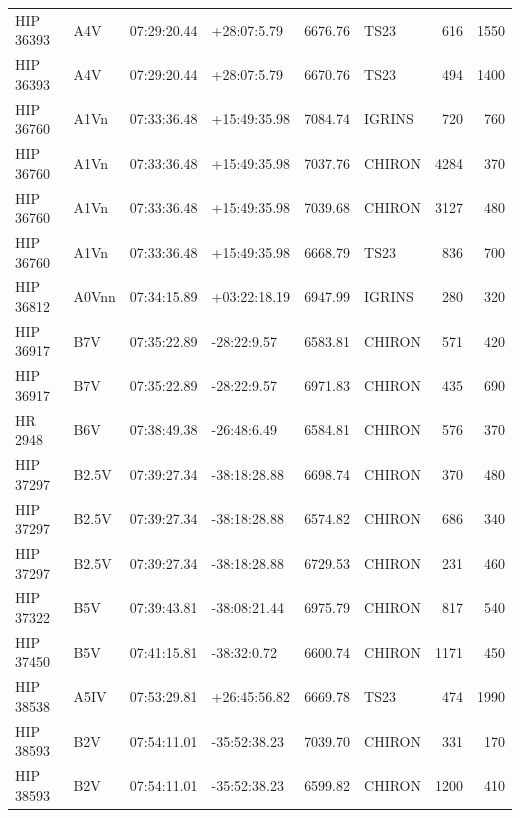 \documentclass{emulateapj}
\begin{document}
\begin{longtable*}{|l|lllrlrr|}
   HIP 36393 &            A4V &    07:29:20.44 &    +28:07:5.79 &  6676.76 &       TS23 &      616 &    1550 \\
   HIP 36393 &            A4V &    07:29:20.44 &    +28:07:5.79 &  6670.76 &       TS23 &      494 &    1400 \\
   HIP 36760 &           A1Vn &    07:33:36.48 &   +15:49:35.98 &  7084.74 &     IGRINS &      720 &     760 \\
   HIP 36760 &           A1Vn &    07:33:36.48 &   +15:49:35.98 &  7037.76 &     CHIRON &     4284 &     370 \\
   HIP 36760 &           A1Vn &    07:33:36.48 &   +15:49:35.98 &  7039.68 &     CHIRON &     3127 &     480 \\
   HIP 36760 &           A1Vn &    07:33:36.48 &   +15:49:35.98 &  6668.79 &       TS23 &      836 &     700 \\
   HIP 36812 &          A0Vnn &    07:34:15.89 &   +03:22:18.19 &  6947.99 &     IGRINS &      280 &     320 \\
   HIP 36917 &            B7V &    07:35:22.89 &    -28:22:9.57 &  6583.81 &     CHIRON &      571 &     420 \\
   HIP 36917 &            B7V &    07:35:22.89 &    -28:22:9.57 &  6971.83 &     CHIRON &      435 &     690 \\
     HR 2948 &            B6V &    07:38:49.38 &    -26:48:6.49 &  6584.81 &     CHIRON &      576 &     370 \\
   HIP 37297 &          B2.5V &    07:39:27.34 &   -38:18:28.88 &  6698.74 &     CHIRON &      370 &     480 \\
   HIP 37297 &          B2.5V &    07:39:27.34 &   -38:18:28.88 &  6574.82 &     CHIRON &      686 &     340 \\
   HIP 37297 &          B2.5V &    07:39:27.34 &   -38:18:28.88 &  6729.53 &     CHIRON &      231 &     460 \\
   HIP 37322 &            B5V &    07:39:43.81 &   -38:08:21.44 &  6975.79 &     CHIRON &      817 &     540 \\
   HIP 37450 &            B5V &    07:41:15.81 &    -38:32:0.72 &  6600.74 &     CHIRON &     1171 &     450 \\
   HIP 38538 &           A5IV &    07:53:29.81 &   +26:45:56.82 &  6669.78 &       TS23 &      474 &    1990 \\
   HIP 38593 &            B2V &    07:54:11.01 &   -35:52:38.23 &  7039.70 &     CHIRON &      331 &     170 \\
   HIP 38593 &            B2V &    07:54:11.01 &   -35:52:38.23 &  6599.82 &     CHIRON &     1200 &     410 \\

\end{longtable*}
\end{document}
